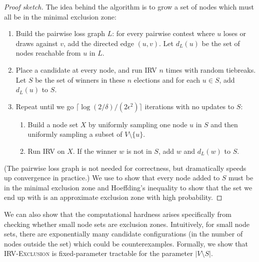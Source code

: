 \documentclass{article}
\theoremstyle{theorem}
\theoremstyle{definition}
\begin{document}
\begin{proof}[Proof sketch]
The idea behind the algorithm is to grow a set of nodes which must all be in the minimal exclusion zone:
\begin{enumerate}
  \item Build the pairwise loss graph $L$: for every pairwise contest where $u$ loses or draws against $v$, add the directed edge $(u, v)$. Let $d_L(u)$ be the set of nodes reachable from $u$ in $L$. 
  \item Place a candidate at every node, and run IRV $n$ times with random tiebreaks. Let $S$ be the set of winners in these $n$ elections and for each $u \in S$, add $d_L(u)$ to $S$. 
  \item Repeat until we go $\lceil\log(2/\delta)/(2\epsilon^2)\rceil$ iterations with no updates to $S$:
  \begin{enumerate}
    \item Build a node set $X$ by uniformly sampling one node $u$ in $S$ and then uniformly sampling a subset of $V\setminus \{u\}$.  
    \item Run IRV on $X$. If the winner $w$ is not in $S$, add $w$ and $d_L(w)$ to $S$.
  \end{enumerate} 
\end{enumerate}
(The pairwise loss graph is not needed for correctness, but dramatically speeds up convergence in practice.)
We use  to show that every node added to $S$ must be in the minimal exclusion zone and Hoeffding's inequality to show that the set we end up with is an approximate exclusion zone with high probability.
\end{proof}

We can also show that the computational hardness arises specifically from checking whether small node sets are exclusion zones. Intuitively, for small node sets, there are exponentially many candidate configurations (in the number of nodes outside the set) which could be counterexamples. Formally, we show that \textsc{IRV-Exclusion} is fixed-parameter tractable for the parameter $|V\setminus S|$.
\end{document}
